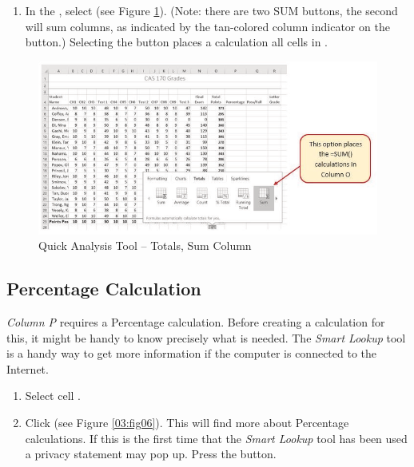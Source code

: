 \begin{enumerate}[resume]
	\item In the , select  (see Figure \ref{03:fig05}). (Note: there are two SUM buttons, the second will sum columns, as indicated by the tan-colored column indicator on the button.) Selecting the  button places a  calculation all cells in .
\end{enumerate}

\begin{figure}[H]
	\centering
	\includegraphics[width=\maxwidth{.95\linewidth}]{gfx/ch03_fig05}
	\caption{Quick Analysis Tool – Totals, Sum Column}
	\label{03:fig05}
\end{figure}

\subsection{Percentage Calculation}

\textit{Column P} requires a Percentage calculation. Before creating a calculation for this, it might be handy to know precisely what is needed. The \textit{Smart Lookup} tool is a handy way to get more information if the computer is connected to the Internet.

\begin{enumerate}
	\item Select cell .
	\item Click  (see Figure \ref{03:fig06}). This will find more about Percentage calculations. If this is the first time that the \textit{Smart Lookup} tool has been used a privacy statement may pop up. Press the  button.
\end{enumerate}

